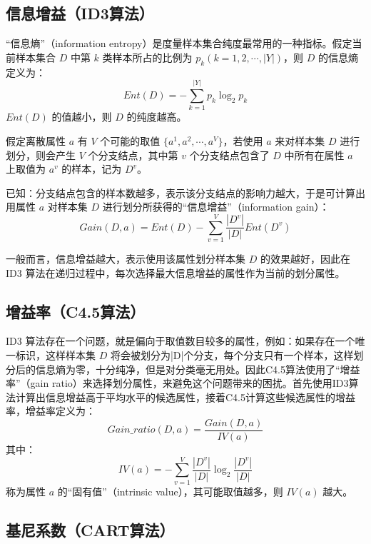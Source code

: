 \documentclass[12pt, a4paper]{article} %
\begin{document}
\subsection{信息增益（ID3算法）}

“信息熵”（information entropy）是度量样本集合纯度最常用的一种指标。假定当前样本集合 $D$ 中第 $k$ 类样本所占的比例为 $p_k (k = 1, 2, \cdots, |Y|)$，则 $D$ 的信息熵定义为：
\begin{equation*}
    Ent(D) = - \sum_{k = 1}^{|Y|} p_k \log_2 p_k
\end{equation*}
$Ent(D)$ 的值越小，则 $D$ 的纯度越高。

假定离散属性 $a$ 有 $V$ 个可能的取值 $\{a^1, a^2, \cdots, a^V\}$，若使用 $a$ 来对样本集 $D$ 进行划分，则会产生 $V$ 个分支结点，其中第 $v$ 个分支结点包含了 $D$ 中所有在属性 $a$ 上取值为 $a^v$ 的样本，记为 $D^v$。

已知：分支结点包含的样本数越多，表示该分支结点的影响力越大，于是可计算出用属性 $a$ 对样本集 $D$ 进行划分所获得的“信息增益”（information gain）：
\begin{equation*}
    Gain(D, a) = Ent(D) - \sum_{v = 1}^{V} \frac{|D^v|}{|D|} Ent(D^v)
\end{equation*}

一般而言，信息增益越大，表示使用该属性划分样本集 $D$ 的效果越好，因此在 ID3 算法在递归过程中，每次选择最大信息增益的属性作为当前的划分属性。

\subsection{增益率（C4.5算法）}

ID3 算法存在一个问题，就是偏向于取值数目较多的属性，例如：如果存在一个唯一标识，这样样本集 $D$ 将会被划分为|D|个分支，每个分支只有一个样本，这样划分后的信息熵为零，十分纯净，但是对分类毫无用处。因此C4.5算法使用了“增益率”（gain ratio）来选择划分属性，来避免这个问题带来的困扰。首先使用ID3算法计算出信息增益高于平均水平的候选属性，接着C4.5计算这些候选属性的增益率，增益率定义为：
\begin{equation*}
    Gain\_ratio(D, a) = \frac{Gain(D, a)}{IV(a)}
\end{equation*}
其中：
\begin{equation*}
    IV(a) = - \sum_{v = 1}^{V} \frac{|D^v|}{|D|} \log_2 \frac{|D^v|}{|D|}
\end{equation*}
称为属性 $a$ 的“固有值”（intrinsic value），其可能取值越多，则 $IV(a)$ 越大。

\subsection{基尼系数（CART算法）}
\end{document}
